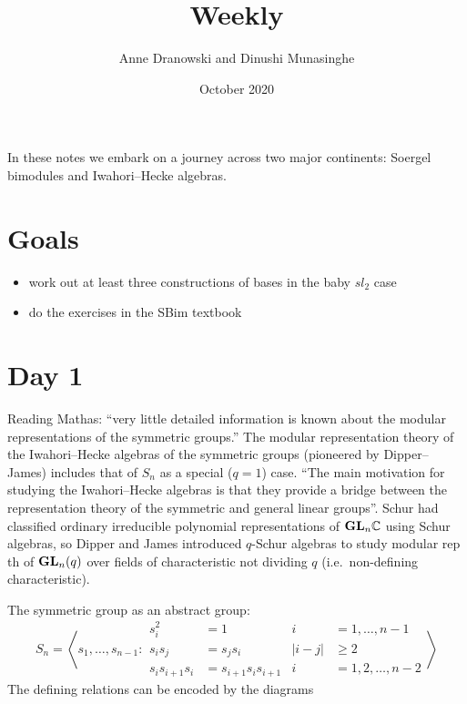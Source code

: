 \documentclass[11pt]{article}
\title{Weekly}
\author{Anne Dranowski and Dinushi Munasinghe}
\date{October 2020}
\begin{document}
\maketitle

In these notes we embark on a journey across two major continents: Soergel bimodules and Iwahori--Hecke algebras.

\section*{Goals}

\begin{itemize}
    \item work out at least three constructions of bases in the baby $sl_2$ case 
    \item do the exercises in the SBim textbook
\end{itemize}

% 

\section*{Day 1}

Reading Mathas: ``very little detailed information is known about the modular representations of the symmetric groups.'' The modular representation theory of the Iwahori--Hecke algebras of the symmetric groups (pioneered by Dipper--James) includes that of $S_n$ as a special ($q=1$) case. ``The main motivation for studying the Iwahori--Hecke algebras is that they provide a bridge between the representation theory of the symmetric and general linear groups''. Schur had classified ordinary irreducible polynomial representations of ${\mathbf{GL}}_n\mathbb C$ using Schur algebras, so Dipper and James introduced $q$-Schur algebras to study modular rep th of ${\mathbf{GL}}_n(q)$ over fields of characteristic not dividing $q$ (i.e.\ non-defining characteristic). 

The symmetric group as an abstract group: 
\begin{equation}
    S_n = \left\langle s_1,\dots, s_{n-1} : \begin{aligned}
        s_i^2 &= 1 & i &= 1,\dots, n-1 \\
        s_i s_j &= s_j s_i & |i - j| & \ge 2 \\
        s_i s_{i+1} s_i &= s_{i + 1} s_i s_{i + 1} & i & = 1,2,\dots, n-2 
    \end{aligned}\right\rangle 
\end{equation}
The defining relations can be encoded by the diagrams
\end{document}
